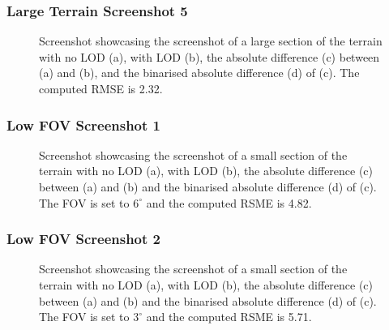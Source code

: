 \subsubsection{Large Terrain Screenshot 5}
\begin{figure}[H]
  \centering
  \qquad
  \qquad
  \qquad
  \caption{Screenshot showcasing the screenshot of a large section of the terrain with no LOD (a), with LOD (b),
   the absolute difference (c) between (a) and (b), and the binarised absolute difference (d) of (c). The computed RMSE is 2.32.}\label{fig:results-large-5}
\end{figure}

\subsubsection{Low FOV Screenshot 1}
\begin{figure}[H]
  \centering
  \qquad
  \qquad
  \qquad
  \caption{Screenshot showcasing the screenshot of a small section of the terrain with no LOD (a), with LOD (b),
  the absolute difference (c) between (a) and (b) and the binarised absolute difference (d) of (c). The FOV is set to $6^{\circ}$ and the computed RSME is 4.82.}\label{fig:results-zoom-1}
\end{figure}
\subsubsection{Low FOV Screenshot 2}
\begin{figure}[H]
  \centering
  \qquad
  \qquad
  \qquad
  \caption{Screenshot showcasing the screenshot of a small section of the terrain with no LOD (a), with LOD (b),
  the absolute difference (c) between (a) and (b) and the binarised absolute difference (d) of (c). The FOV is set to $3^{\circ}$ and the computed RSME is 5.71.}\label{fig:results-zoom-2}
\end{figure}
